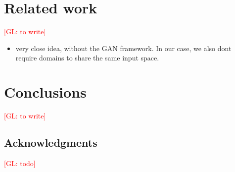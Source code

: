\documentclass{article}
\newcommand{\glnote}[1]{\textcolor{red}{[GL: #1]}}
\theoremstyle{plain}
\begin{document}
\section{Related work}

\glnote{to write}

\begin{itemize}
    \item \cite{ganin2014unsupervised} very close idea, without the GAN framework. In our case, we also dont require domains to share the same input space.
\end{itemize}


\section{Conclusions}

\glnote{to write}

\subsection*{Acknowledgments}

\glnote{todo}



\end{document}

